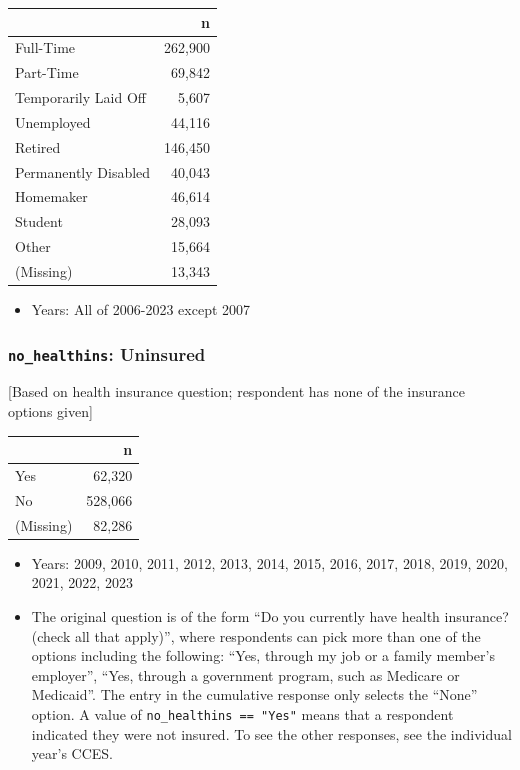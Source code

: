 \documentclass[10pt,article,oneside]{memoir}
\theoremstyle{definition}
\begin{document}
\begin{table}[H]
\centering
\begin{tabular}[t]{lr}
\toprule
 & n\\
\midrule
Full-Time & 262,900\\
Part-Time & 69,842\\
Temporarily Laid Off & 5,607\\
Unemployed & 44,116\\
Retired & 146,450\\
Permanently Disabled & 40,043\\
Homemaker & 46,614\\
Student & 28,093\\
Other & 15,664\\
(Missing) & 13,343\\
\bottomrule
\end{tabular}
\end{table}

\begin{itemize}
\tightlist
\item
  Years: All of 2006-2023 except 2007
\end{itemize}

\subsubsection{\texorpdfstring{\texttt{no\_healthins}:
Uninsured}{no\_healthins: Uninsured}}\label{no_healthins-uninsured}

{[}Based on health insurance question; respondent has none of the
insurance options given{]}

\begin{table}[H]
\centering
\begin{tabular}[t]{lr}
\toprule
 & n\\
\midrule
Yes & 62,320\\
No & 528,066\\
(Missing) & 82,286\\
\bottomrule
\end{tabular}
\end{table}

\begin{itemize}
\tightlist
\item
  Years: 2009, 2010, 2011, 2012, 2013, 2014, 2015, 2016, 2017, 2018,
  2019, 2020, 2021, 2022, 2023
\item
  The original question is of the form ``Do you currently have health
  insurance? (check all that apply)'', where respondents can pick more
  than one of the options including the following: ``Yes, through my job
  or a family member's employer'', ``Yes, through a government program,
  such as Medicare or Medicaid''. The entry in the cumulative response
  only selects the ``None'' option. A value of
  \texttt{no\_healthins\ ==\ "Yes"} means that a respondent indicated
  they were not insured. To see the other responses, see the individual
  year's CCES.
\end{itemize}
\end{document}
